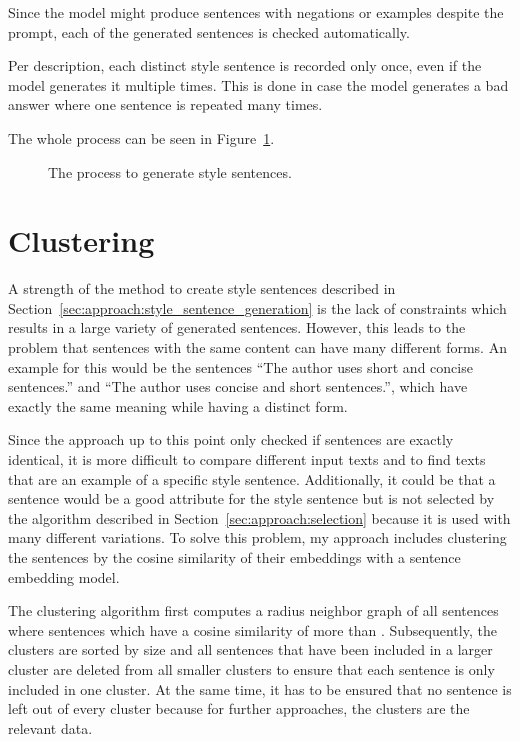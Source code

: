Since the model might produce sentences with negations or examples despite the prompt, each of the generated sentences is checked automatically.

Per description, each distinct style sentence is recorded only once, even if the model generates it multiple times. This is done in case the model generates a bad answer where one sentence is repeated many times.

The whole process can be seen in Figure~\ref{fig:style_sentence_generation}.

\begin{figure}[ht]
  
  \caption{The process to generate style sentences.}
  \label{fig:style_sentence_generation}
\end{figure}


\section{Clustering}
\label{sec:approach:clustering}
A strength of the method to create style sentences described in Section~\ref{sec:approach:style_sentence_generation} is the lack of constraints which results in a large variety of generated sentences. However, this leads to the problem that sentences with the same content can have many different forms. An example for this would be the sentences \enquote{The author uses short and concise sentences.} and \enquote{The author uses concise and short sentences.}, which have exactly the same meaning while having a distinct form.

Since the approach up to this point only checked if sentences are exactly identical, it is more difficult to compare different input texts and to find texts that are an example of a specific style sentence. Additionally, it could be that a sentence would be a good attribute for the style sentence but is not selected by the algorithm described in Section~\ref{sec:approach:selection} because it is used with many different variations.
To solve this problem, my approach includes clustering the sentences by the cosine similarity of their embeddings with a sentence embedding model. %

The clustering algorithm first computes a radius neighbor graph of all sentences where sentences which have a cosine similarity of more than \minCosineSimilarity{}. Subsequently, the clusters are sorted by size and all sentences that have been included in a larger cluster are deleted from all smaller clusters to ensure that each sentence is only included in one cluster. At the same time, it has to be ensured that no sentence is left out of every cluster because for further approaches, the clusters are the relevant data.

